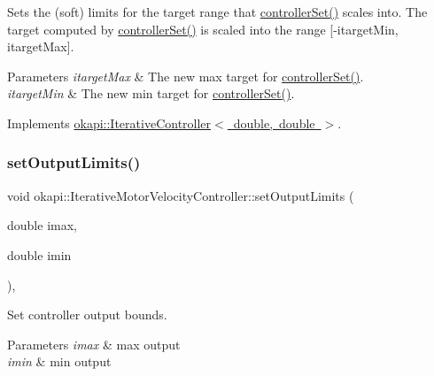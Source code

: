 Sets the (soft) limits for the target range that \mbox{\hyperlink{classokapi_1_1IterativeMotorVelocityController_a5a36064df12b3d34f2bfa09ca1992b9e}{controller\+Set()}} scales into. The target computed by \mbox{\hyperlink{classokapi_1_1IterativeMotorVelocityController_a5a36064df12b3d34f2bfa09ca1992b9e}{controller\+Set()}} is scaled into the range \mbox{[}-\/itarget\+Min, itarget\+Max\mbox{]}.


\begin{DoxyParams}{Parameters}
{\em itarget\+Max} & The new max target for \mbox{\hyperlink{classokapi_1_1IterativeMotorVelocityController_a5a36064df12b3d34f2bfa09ca1992b9e}{controller\+Set()}}. \\
\hline
{\em itarget\+Min} & The new min target for \mbox{\hyperlink{classokapi_1_1IterativeMotorVelocityController_a5a36064df12b3d34f2bfa09ca1992b9e}{controller\+Set()}}. \\
\hline
\end{DoxyParams}


Implements \mbox{\hyperlink{classokapi_1_1IterativeController_a7c514b702b78be6c45c03b718edce035}{okapi\+::\+Iterative\+Controller$<$ double, double $>$}}.

\mbox{\label{classokapi_1_1IterativeMotorVelocityController_a7614e53a0847e47e5418df21670c1ddd}} 
\subsubsection{\texorpdfstring{setOutputLimits()}{setOutputLimits()}}
{\footnotesize\ttfamily void okapi\+::\+Iterative\+Motor\+Velocity\+Controller\+::set\+Output\+Limits (\begin{DoxyParamCaption}\item[{double}]{imax,  }\item[{double}]{imin }\end{DoxyParamCaption})\hspace{0.3cm}{\ttfamily [override]}, {\ttfamily [virtual]}}

Set controller output bounds.


\begin{DoxyParams}{Parameters}
{\em imax} & max output \\
\hline
{\em imin} & min output \\
\hline
\end{DoxyParams}


